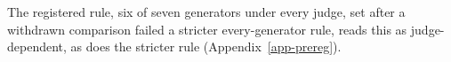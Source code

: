 The registered rule, six of seven generators under every judge, set after a
withdrawn comparison failed a stricter every-generator rule, reads this as
judge-dependent, as does the stricter rule (Appendix~\ref{app-prereg}).
